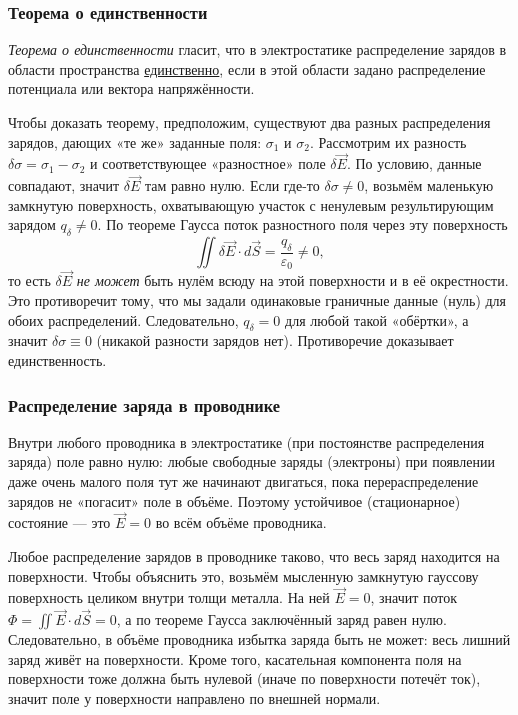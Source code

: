 \documentclass[12pt, a4paper]{article}%
\begin{document}
\subsubsection*{Теорема о единственности}
\textit{Теорема о единственности} гласит, что в электростатике распределение зарядов в области пространства \underline{единственно}, если в этой области задано распределение потенциала или вектора напряжённости.

Чтобы доказать теорему, предположим, существуют два разных распределения зарядов, дающих «те же» заданные поля: $\sigma_1$ и $\sigma_2$. Рассмотрим их разность $\delta\sigma=\sigma_1-\sigma_2$ и соответствующее «разностное» поле $\delta\vec E$.
По условию, данные совпадают, значит $\delta\vec E$ там равно нулю.
Если где-то $\delta\sigma\ne0$, возьмём маленькую замкнутую поверхность, охватывающую участок с ненулевым результирующим зарядом $q_\delta\ne0$. По теореме Гаусса поток разностного поля через эту поверхность
\[
\iint \delta\vec E\cdot d\vec S=\frac{q_\delta}{\varepsilon_0}\ne0,
\]
то есть $\delta\vec E$ \emph{не может} быть нулём всюду на этой поверхности и в её окрестности. Это противоречит тому, что мы задали одинаковые граничные данные (нуль) для обоих распределений. Следовательно, $q_\delta=0$ для любой такой «обёртки», а значит $\delta\sigma\equiv0$ (никакой разности зарядов нет). Противоречие доказывает единственность.

 
\subsubsection*{Распределение заряда в проводнике}
Внутри любого проводника в электростатике (при постоянстве распределения заряда) поле равно нулю: любые свободные заряды (электроны) при появлении даже очень малого поля тут же начинают двигаться, пока перераспределение зарядов не «погасит» поле в объёме. Поэтому устойчивое (стационарное) состояние — это $ \vec E = 0 $ во всём объёме проводника.

Любое распределение зарядов в проводнике таково, что весь заряд находится на поверхности. Чтобы объяснить это, возьмём мысленную замкнутую гауссову поверхность целиком внутри толщи металла. На ней $ \vec E = 0 $, значит поток $ \Phi=\iint \vec E\cdot d\vec S = 0 $, а по теореме Гаусса заключённый заряд равен нулю. Следовательно, в объёме проводника избытка заряда быть не может: весь лишний заряд живёт на поверхности. Кроме того, касательная компонента поля на поверхности тоже должна быть нулевой (иначе по поверхности потечёт ток), значит поле у поверхности направлено по внешней нормали.
\end{document}
